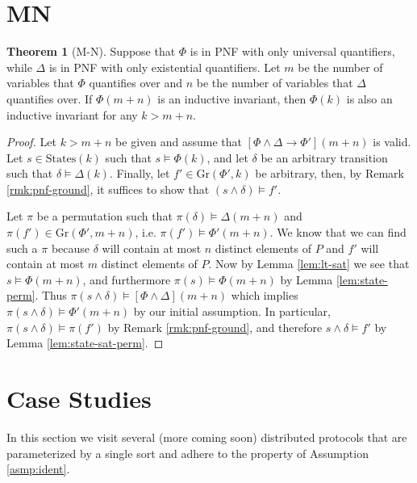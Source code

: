 \documentclass[12pt]{article}
\theoremstyle{definition}
\newtheorem{theorem}{Theorem}
\theoremstyle{remark}
\newcommand{\states}{\text{States}}
\newcommand{\gr}{\text{Gr}}
\begin{document}
\section{MN}
\begin{theorem}[M-N]
  Suppose that $\Phi$ is in PNF with only universal quantifiers, while $\Delta$ is in PNF with only existential quantifiers.  Let $m$ be the number of variables that $\Phi$ quantifies over and $n$ be the number of variables that $\Delta$ quantifies over.  If $\Phi(m+n)$ is an inductive invariant, then $\Phi(k)$ is also an inductive invariant for any $k>m+n$.
\end{theorem}
\begin{proof}
  Let $k>m+n$ be given and assume that $[\Phi\land\Delta \rightarrow \Phi'](m+n)$ is valid.  Let $s \in \states(k)$ such that $s \models \Phi(k)$, and let $\delta$ be an arbitrary transition such that $\delta \models \Delta(k)$.  Finally, let $f' \in \gr(\Phi',k)$ be arbitrary, then, by Remark \ref{rmk:pnf-ground}, it suffices to show that $(s \land \delta) \models f'$.

  Let $\pi$ be a permutation such that $\pi(\delta) \models \Delta(m+n)$ and $\pi(f') \in \gr(\Phi',m+n)$, i.e. $\pi(f') \models \Phi'(m+n)$.  We know that we can find such a $\pi$ because $\delta$ will contain at most $n$ distinct elements of $P$ and $f'$ will contain at most $m$ distinct elements of $P$.  Now by Lemma \ref{lem:lt-sat} we see that $s \models \Phi(m+n)$, and furthermore $\pi(s) \models \Phi(m+n)$ by Lemma \ref{lem:state-perm}.  Thus $\pi(s \land \delta) \models [\Phi\land\Delta](m+n)$ which implies $\pi(s \land \delta) \models \Phi'(m+n)$ by our initial assumption.  In particular, $\pi(s \land \delta) \models \pi(f')$ by Remark \ref{rmk:pnf-ground}, and therefore $s \land \delta \models f'$ by Lemma \ref{lem:state-sat-perm}.
\end{proof}



\section{Case Studies}
In this section we visit several (more coming soon) distributed protocols that are parameterized by a single sort and adhere to the property of Assumption \ref{asmp:ident}.
\end{document}

